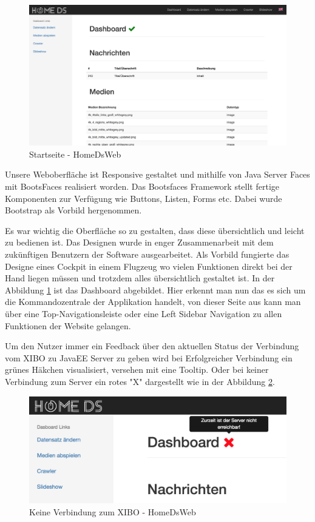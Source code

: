 \begin{figure}[H]
\centering
\includegraphics[width=1\textwidth]{images/08_HomeDsWeb/DashboardHomeDsWeb.png}
\caption{Startseite - HomeDsWeb}
\label{img:Startseite}
\end{figure}

Unsere Weboberfläche ist Responsive gestaltet und mithilfe von Java Server Faces mit BootsFaces realisiert worden. Das Bootsfaces Framework stellt fertige Komponenten zur Verfügung wie Buttons, Listen, Forms etc. Dabei wurde Bootstrap als Vorbild hergenommen.

Es war wichtig die Oberfläche so zu gestalten, dass diese übersichtlich und leicht zu bedienen ist. Das Designen wurde in enger Zusammenarbeit mit dem zukünftigen Benutzern der Software ausgearbeitet. Als Vorbild fungierte das Designe eines Cockpit in einem Flugzeug wo vielen Funktionen direkt bei der Hand liegen müssen und trotzdem alles übersichtlich gestaltet ist. In der Abbildung \ref{img:Startseite} ist das Dashboard abgebildet. 
Hier erkennt man nun das es sich um die Kommandozentrale der Applikation handelt, von dieser Seite aus kann man über eine Top-Navigationsleiste oder eine Left Sidebar Navigation zu allen Funktionen der Website gelangen. 

Um den Nutzer immer ein Feedback über den aktuellen Status der Verbindung vom XIBO zu JavaEE Server zu geben wird bei Erfolgreicher Verbindung ein grünes Häkchen visualisiert, versehen mit eine Tooltip. Oder bei keiner Verbindung zum Server ein rotes "X" dargestellt wie in der Abbildung  \ref{img:NoConnection}.

\begin{figure}[H]
\includegraphics[width=1\textwidth]{images/08_HomeDsWeb/DashboardNoConnection.png}
\caption{Keine Verbindung zum XIBO - HomeDsWeb}
\label{img:NoConnection}
\end{figure}

